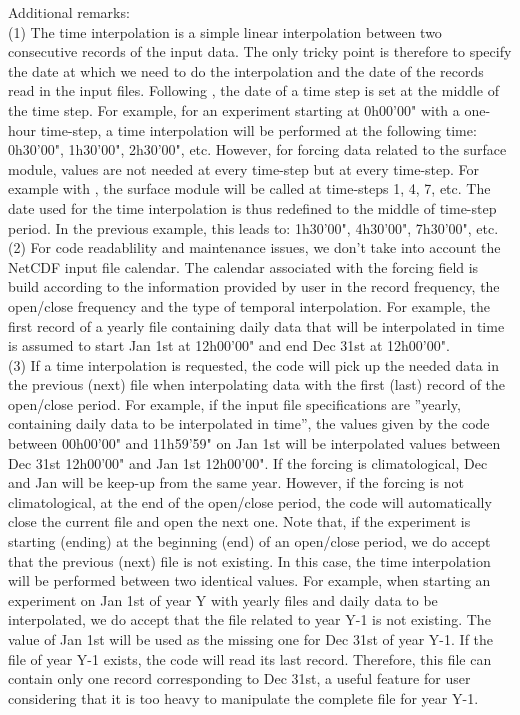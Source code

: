 \documentclass[../main/NEMO_manual]{subfiles}
\begin{document}
Additional remarks:\\
(1) The time interpolation is a simple linear interpolation between two consecutive records of the input data.
The only tricky point is therefore to specify the date at which we need to do the interpolation and
the date of the records read in the input files.
Following \citet{leclair.madec_OM09}, the date of a time step is set at the middle of the time step.
For example, for an experiment starting at 0h00'00" with a one-hour time-step,
a time interpolation will be performed at the following time: 0h30'00", 1h30'00", 2h30'00", etc.
However, for forcing data related to the surface module,
values are not needed at every time-step but at every  time-step.
For example with , the surface module will be called at time-steps 1, 4, 7, etc.
The date used for the time interpolation is thus redefined to the middle of  time-step period.
In the previous example, this leads to: 1h30'00", 4h30'00", 7h30'00", etc. \\
(2) For code readablility and maintenance issues, we don't take into account the NetCDF input file calendar.
The calendar associated with the forcing field is build according to the information provided by
user in the record frequency, the open/close frequency and the type of temporal interpolation.
For example, the first record of a yearly file containing daily data that will be interpolated in time is assumed to
start Jan 1st at 12h00'00" and end Dec 31st at 12h00'00". \\
(3) If a time interpolation is requested, the code will pick up the needed data in the previous (next) file when
interpolating data with the first (last) record of the open/close period.
For example, if the input file specifications are ''yearly, containing daily data to be interpolated in time'',
the values given by the code between 00h00'00" and 11h59'59" on Jan 1st will be interpolated values between
Dec 31st 12h00'00" and Jan 1st 12h00'00".
If the forcing is climatological, Dec and Jan will be keep-up from the same year.
However, if the forcing is not climatological, at the end of
the open/close period, the code will automatically close the current file and open the next one.
Note that, if the experiment is starting (ending) at the beginning (end) of
an open/close period, we do accept that the previous (next) file is not existing.
In this case, the time interpolation will be performed between two identical values.
For example, when starting an experiment on Jan 1st of year Y with yearly files and daily data to be interpolated,
we do accept that the file related to year Y-1 is not existing.
The value of Jan 1st will be used as the missing one for Dec 31st of year Y-1.
If the file of year Y-1 exists, the code will read its last record.
Therefore, this file can contain only one record corresponding to Dec 31st,
a useful feature for user considering that it is too heavy to manipulate the complete file for year Y-1.
\end{document}
